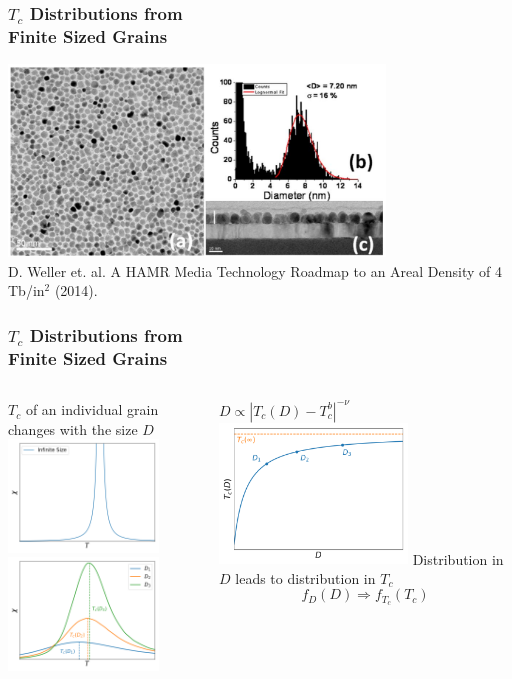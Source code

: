 \documentclass{beamer}
\begin{document}
\begin{frame}
	\frametitle{$T_c$ Distributions from \\Finite Sized Grains}
	\centering
	\includegraphics[width=10cm]{Images/roadmap_grains} \\
	\tiny D. Weller et. al. A HAMR Media Technology Roadmap to an Areal Density of 4 Tb/in$^2$ (2014).
\end{frame}

\begin{frame}
	\frametitle{$T_c$ Distributions from \\Finite Sized Grains}
	\begin{columns}
		\column{6cm}
		\begin{center}
			$T_c$ of an individual grain changes with the size $D$ \\ \vspace{4mm}
			\includegraphics[width=4cm]{Images/suscept_inf}\\
			\includegraphics[width=4cm]{Images/suscept}
		\end{center}
		\column{6cm}
		\begin{center}
			$D \propto |T_c(D)-T_c^b|^{-\nu}$ \\ \vspace{3mm}
			\includegraphics[width=5cm]{Images/TcD_new}
			\vspace{4mm}
			Distribution in $D$ leads to distribution in $T_c$
			$$
			f_D(D) \Longrightarrow f_{T_c}(T_c)
			$$
		\end{center}
	\end{columns}
\end{frame}
\end{document}
